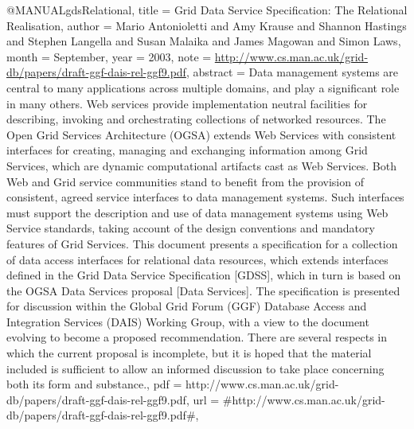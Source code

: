 @MANUAL{gdsRelational,
  title = {{Grid Data Service Specification: The Relational Realisation}},
  author = {Mario Antonioletti and Amy Krause and Shannon Hastings and Stephen
	Langella and Susan Malaika and James Magowan and Simon Laws},
  month = {September},
  year = {2003},
  note = {\url{http://www.cs.man.ac.uk/grid-db/papers/draft-ggf-dais-rel-ggf9.pdf}},
  abstract = {Data management systems are central to many applications across multiple
domains,
	and play a significant role in many others. Web services
provide
	implementation neutral facilities for describing, invoking and
orchestrating
	collections of networked resources. The Open Grid Services
Architecture
	(OGSA) extends Web Services with consistent interfaces for
creating,
	managing and exchanging information among Grid Services, which
are
	dynamic computational artifacts cast as Web Services. Both Web
and
	Grid service communities stand to benefit from the provision of
consistent,
	agreed service interfaces to data management systems. Such
interfaces
	must support the description and use of data management systems
using
	Web Service standards, taking account of the design conventions
and
	mandatory features of Grid Services. This document presents a
specification
	for a collection of data access interfaces for relational
data resources,
	which extends interfaces defined in the Grid Data
Service Specification
	[GDSS], which in turn is based on the OGSA Data
Services proposal
	[Data Services]. The specification is presented
for discussion within
	the Global Grid Forum (GGF) Database Access
and Integration Services
	(DAIS) Working Group, with a view to the
document evolving to become
	a proposed recommendation. There are
several respects in which the
	current proposal is incomplete, but it is
hoped that the material
	included is sufficient to allow an informed
discussion to take place
	concerning both its form and substance.},
  pdf = {http://www.cs.man.ac.uk/grid-db/papers/draft-ggf-dais-rel-ggf9.pdf},
  url = {#http://www.cs.man.ac.uk/grid-db/papers/draft-ggf-dais-rel-ggf9.pdf#},
}

